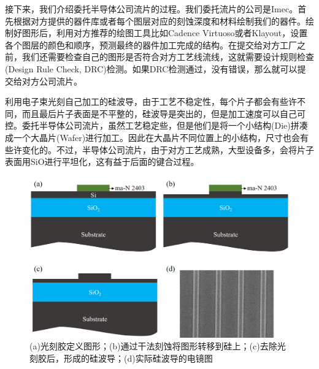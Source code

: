 接下来，我们介绍委托半导体公司流片的过程。我们委托流片的公司是Imec\cite{Imec}。首先根据对方提供的器件库或者每个图层对应的刻蚀深度和材料绘制我们的器件。绘制好图形后，利用对方推荐的绘图工具比如Cadence Virtuoso或者Klayout，设置各个图层的颜色和顺序，预测最终的器件加工完成的结构。在提交给对方工厂之前，我们还需要检查自己的图形是否符合对方工艺线流线，这就需要设计规则检查(Design Rule Check, DRC)检测。如果DRC检测通过，没有错误，那么就可以提交给对方公司流片。

利用电子束光刻自己加工的硅波导，由于工艺不稳定性，每个片子都会有些许不同，而且最后片子表面是不平整的，硅波导是突出的，但是加工速度可以自己可控。委托半导体公司流片，虽然工艺稳定些，但是他们是将一个小结构(Die)拼凑成一个大晶片(Wafer)进行加工。因此在大晶片不同位置上的小结构，尺寸也会有些许变化的。不过，半导体公司流片，由于对方工艺成熟，大型设备多，会将片子表面用SiO进行平坦化，这有益于后面的键合过程。

\begin{figure}[htb]
	\centering
	\includegraphics[width=14cm]{./Pictures/chapt4_3D_etch_siwg.jpg}
	\caption{(a)光刻胶定义图形；(b)通过干法刻蚀将图形转移到硅上；(c)去除光刻胶后，形成的硅波导；(d)实际硅波导的电镜图}
	\label{chapt4_3D_etch_siwg}
\end{figure}
